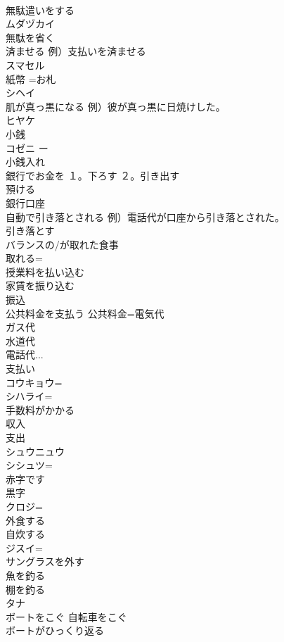 \documentclass[8pt]{extreport}
\begin{document}
\begin{CJK}{UTF8}{min}
\\	無駄遣いをする	
\\	ムダヅカイ
\\	無駄を省く	
\\	済ませる 例）支払いを済ませる	
\\	スマセル
\\	紙幣 =お札	
\\	シヘイ
\\	肌が真っ黒になる 例）彼が真っ黒に日焼けした。	
\\	ヒヤケ
\\	小銭	
\\	コゼニ ー
\\	小銭入れ 
\\	銀行でお金を １。下ろす ２。引き出す 
\\	預ける	
\\	銀行口座	
\\	自動で引き落とされる 例）電話代が口座から引き落とされた。 
\\	引き落とす	
\\	バランスの/が取れた食事	
\\	取れる=
\\	授業料を払い込む	
\\	家賃を振り込む 
\\	振込	
\\	公共料金を支払う 公共料金=電気代
\\	ガス代
\\	水道代
\\	電話代... 
\\	支払い	
\\	コウキョウ=
\\	シハライ=
\\	手数料がかかる	
\\	収入 
\\	支出	
\\	シュウニュウ 
\\	シシュツ=
\\	赤字です 
\\	黒字	
\\	クロジ=
\\	外食する 
\\	自炊する	
\\	ジスイ=
\\	サングラスを外す	
\\	魚を釣る	
\\	棚を釣る	
\\	タナ
\\	ボートをこぐ 自転車をこぐ	
\\	ボートがひっくり返る 

\end{CJK}
\end{document}

